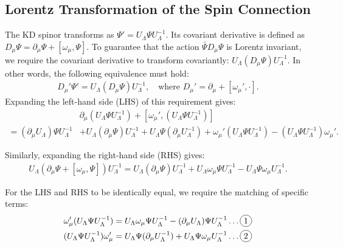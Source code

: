 \begin{subappendices}

\section{Lorentz Transformation of the Spin Connection}\label{sec:Lorentz_spin_connection}

The KD spinor transforms as $\Psi'=U_\Lambda \Psi U_\Lambda^{-1}$. Its covariant derivative is defined as $D_\mu \Psi=\partial_\mu\Psi+[\omega_\mu,\Psi]$. To guarantee that the action $\bar{\Psi}D_\mu\Psi$ is Lorentz invariant, we require the covariant derivative to transform covariantly: $U_\Lambda (D_\mu\Psi) U_\Lambda^{-1}$. 
In other words, the following equivalence must hold:
\begin{equation}
\begin{aligned}
    D_\mu'\Psi'=U_\Lambda (D_\mu\Psi) U_\Lambda^{-1},\quad \text{where } D_\mu'=\partial_\mu+[\omega_\mu',\cdot].
\end{aligned}
\end{equation}
Expanding the left-hand side (LHS) of this requirement gives: 
\begin{equation}
\begin{aligned}
    &\partial_\mu(U_\Lambda \Psi U_\Lambda^{-1})+[\omega_\mu',(U_\Lambda \Psi U_\Lambda^{-1})]\\
    =(\partial_\mu U_\Lambda) \Psi U_\Lambda^{-1} &+ U_\Lambda (\partial_\mu\Psi) U_\Lambda^{-1}+ U_\Lambda \Psi (\partial_\mu U_\Lambda^{-1})+\omega_\mu'(U_\Lambda \Psi U_\Lambda^{-1})-(U_\Lambda \Psi U_\Lambda^{-1})\omega_\mu'.
\end{aligned}
\end{equation}

Similarly, expanding the right-hand side (RHS) gives: 
\begin{equation}
\begin{aligned}
    U_\Lambda (\partial_\mu\Psi+[\omega_\mu,\Psi]) U_\Lambda^{-1}= U_\Lambda (\partial_\mu\Psi) U_\Lambda^{-1}+U_\Lambda \omega_\mu\Psi U_\Lambda^{-1}-U_\Lambda \Psi\omega_\mu U_\Lambda^{-1}.
\end{aligned}
\end{equation}

For the LHS and RHS to be identically equal, we require the matching of specific terms:
\begin{equation}
\begin{aligned}
    \omega_\mu'(U_\Lambda \Psi U_\Lambda^{-1})&=U_\Lambda \omega_\mu\Psi U_\Lambda^{-1}-(\partial_\mu U_\Lambda) \Psi U_\Lambda^{-1} \dots \circled{1} \\
    (U_\Lambda \Psi U_\Lambda^{-1})\omega_\mu'&=U_\Lambda \Psi (\partial_\mu U_\Lambda^{-1})+U_\Lambda \Psi\omega_\mu U_\Lambda^{-1} \dots \circled{2}
\end{aligned}
\end{equation}


\end{subappendices}
